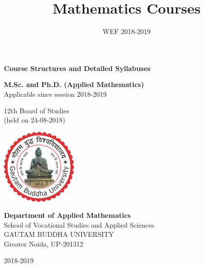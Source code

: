\documentclass{article}
\begin{document}
\begin{titlepage}

\begin{center}
{\Huge\bf Course Structures and Detailed Syllabuses }



\vspace{3cm}
{\Huge\bf M.Sc. and Ph.D. (Applied Mathematics)}\\


\vspace{0.5cm}
{\Large Applicable since session 2018-2019}

\vspace{3cm}
{\huge  12th Board of Studies }\\
\vspace{0.5cm}
{\Large (held on 24-08-2018)}

\vfill
\includegraphics[width=1.5in]{gbu_logo}

\vspace{1cm}
{\bf \LARGE {Department of Applied Mathematics}}\\
{\Large {School of Vocational Studies  and Applied Sciences}}\\
{\Large GAUTAM BUDDHA UNIVERSITY}\\
{\Large Greater Noida, UP-201312}

\vspace{1cm}
{\huge 2018-2019}
\end{center}
\end{titlepage}
\title{Mathematics Courses}
\date{WEF 2018-2019}
\maketitle
\vspace{-2cm}
\tableofcontents
\newpage
\end{document}
